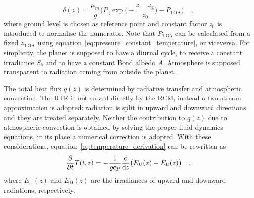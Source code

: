 \documentclass[a4paper,10pt,twocolumn,\classoptions]{article}
\newcommand{\zTOA}{z_\text{TOA}}
\newcommand{\PTOA}{P_\text{TOA}}
\begin{document}
\begin{equation}
  \label{eq:optical_depth_altitude_2}
  \delta(z) = \frac{\mu_m}{g} \bigg( P_\text{g} \exp{\bigg( - \frac{z - z_\text{g}}{z_0} \bigg)} - \PTOA \bigg)
  \quad ,
\end{equation}
where ground level is chosen as reference point and constant factor $z_0$ is introduced to normalise the numerator. Note that $\PTOA$ can be calculated from a fixed $\zTOA$ using equation~\eqref{eq:pressure_constant_temperature}, or viceversa.
For simplicity, the planet is supposed to have a diurnal cycle, to receive a constant irradiance $S_0$ and to have a constant Bond albedo $A$.
Atmosphere is supposed transparent to radiation coming from outside the planet.

The total heat flux $q(z)$ is determined by radiative transfer and atmospheric convection. The RTE is not solved directly by the RCM, instead a two-stream approximation is adopted: radiation is split in upward and downward directions and they are treated separately. Neither the contribution to $q(z)$ due to atmospheric convection is obtained by solving the proper fluid dynamics equations, in its place a numerical correction is adopted.
With these considerations, equation~\eqref{eq:temperature_derivation} can be rewritten as
\begin{equation}
  \label{eq:temperature_time_derivative}
  \pdv*{T(t,z)}{t} = -\frac{1}{\varrho c_P} \odv*{\big( E_\text{U}(z) - E_\text{D}(z) \big)}{z}
  \quad ,
\end{equation}
where $E_\text{U}(z)$ and $E_\text{D}(z)$ are the irradiances of upward and downward radiations, respectively.
\end{document}
